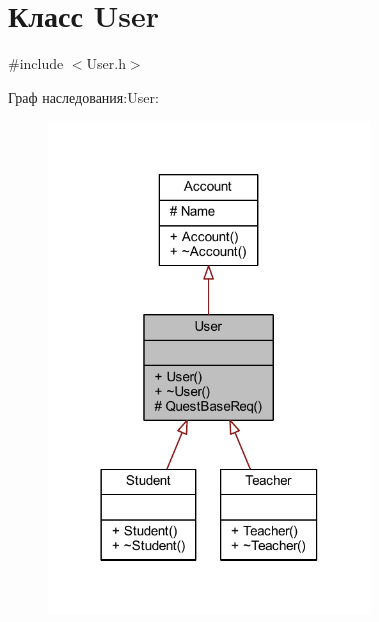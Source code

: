 \hypertarget{class_user}{}\section{Класс User}
\label{class_user}


{\ttfamily \#include $<$User.\+h$>$}



Граф наследования\+:User\+:\nopagebreak
\begin{figure}[H]
\begin{center}
\leavevmode
\includegraphics[width=242pt]{d4/dbc/class_user__inherit__graph}
\end{center}
\end{figure}


